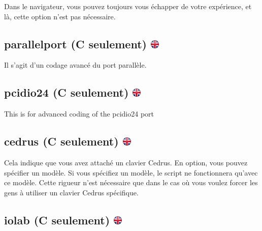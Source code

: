 \documentclass[
]{book}
\begin{document}
Dans le navigateur, vous pouvez toujours vous échapper de votre expérience, et là, cette option n'est pas nécessaire.

\hypertarget{parallelport-c-seulement}{%
\subsection[parallelport (C seulement) ]{\texorpdfstring{parallelport (C seulement) \href{https://www.psytoolkit.org/doc3.2.0/syntax.html\#options-parallelport}{\protect\includegraphics{img/ukflag.png}}}{parallelport (C seulement) }}\label{parallelport-c-seulement}}

Il s'agit d'un codage avancé du port parallèle.

\hypertarget{pcidio24-c-seulement}{%
\subsection[pcidio24 (C seulement) ]{\texorpdfstring{pcidio24 (C seulement) \href{https://www.psytoolkit.org/doc3.2.0/syntax.html\#options-pcidio24}{\protect\includegraphics{img/ukflag.png}}}{pcidio24 (C seulement) }}\label{pcidio24-c-seulement}}

This is for advanced coding of the pcidio24 port

\hypertarget{cedrus-c-seulement}{%
\subsection[cedrus (C seulement) ]{\texorpdfstring{cedrus (C seulement) \href{https://www.psytoolkit.org/doc3.2.0/syntax.html\#options-cedrus}{\protect\includegraphics{img/ukflag.png}}}{cedrus (C seulement) }}\label{cedrus-c-seulement}}

Cela indique que vous avez attaché un clavier Cedrus. En option, vous pouvez spécifier un modèle. Si vous spécifiez un modèle, le script ne fonctionnera qu'avec ce modèle. Cette rigueur n'est nécessaire que dans le cas où vous voulez forcer les gens à utiliser un clavier Cedrus spécifique.

\hypertarget{iolab-c-seulement}{%
\subsection[iolab (C seulement) ]{\texorpdfstring{iolab (C seulement) \href{https://www.psytoolkit.org/doc3.2.0/syntax.html\#options-iolab}{\protect\includegraphics{img/ukflag.png}}}{iolab (C seulement) }}\label{iolab-c-seulement}}
\end{document}
